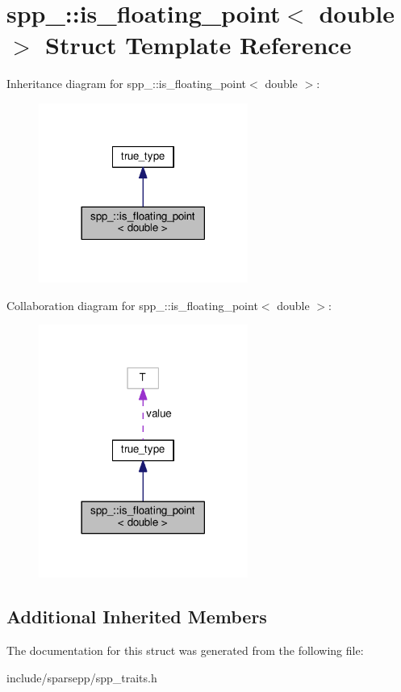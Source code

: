 \hypertarget{structspp___1_1is__floating__point_3_01double_01_4}{}\section{spp\+\_\+\+:\+:is\+\_\+floating\+\_\+point$<$ double $>$ Struct Template Reference}
\label{structspp___1_1is__floating__point_3_01double_01_4}


Inheritance diagram for spp\+\_\+\+:\+:is\+\_\+floating\+\_\+point$<$ double $>$\+:\nopagebreak
\begin{figure}[H]
\begin{center}
\leavevmode
\includegraphics[width=194pt]{structspp___1_1is__floating__point_3_01double_01_4__inherit__graph}
\end{center}
\end{figure}


Collaboration diagram for spp\+\_\+\+:\+:is\+\_\+floating\+\_\+point$<$ double $>$\+:\nopagebreak
\begin{figure}[H]
\begin{center}
\leavevmode
\includegraphics[width=194pt]{structspp___1_1is__floating__point_3_01double_01_4__coll__graph}
\end{center}
\end{figure}
\subsection*{Additional Inherited Members}


The documentation for this struct was generated from the following file\+:\begin{DoxyCompactItemize}
\item 
include/sparsepp/spp\+\_\+traits.\+h\end{DoxyCompactItemize}
